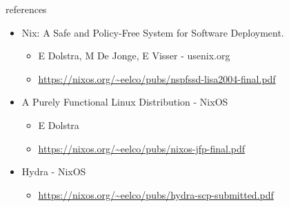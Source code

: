 \documentclass[presentation]{beamer}
\begin{document}
\begin{frame}[label={sec:orgd1c54e1}]{references}
\begin{itemize}
\item\relax [HTML] Nix: A Safe and Policy-Free System for Software Deployment.
\begin{itemize}
\item E Dolstra, M De Jonge, E Visser - usenix.org
\item \url{https://nixos.org/\~eelco/pubs/nspfssd-lisa2004-final.pdf}
\end{itemize}
\item\relax [PDF] A Purely Functional Linux Distribution - NixOS
\begin{itemize}
\item E Dolstra
\item \url{https://nixos.org/\~eelco/pubs/nixos-jfp-final.pdf}
\end{itemize}
\item Hydra - NixOS
\begin{itemize}
\item \url{https://nixos.org/\~eelco/pubs/hydra-scp-submitted.pdf}
\end{itemize}
\end{itemize}
\end{frame}
\end{document}
